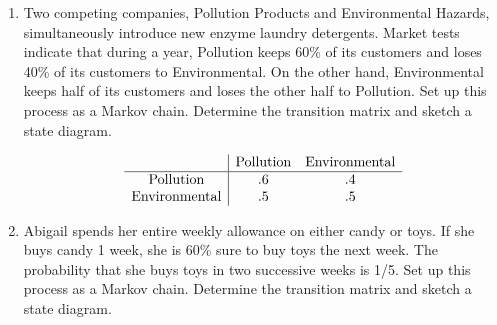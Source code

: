 \documentclass{hw}
\begin{document}
\begin{enumerate}
\item Two competing companies, Pollution Products and Environmental Hazards, simultaneously introduce
new enzyme laundry detergents. Market tests indicate that during a year, Pollution keeps 60\% of
its customers and loses 40\% of its customers to Environmental. On the other hand, Environmental
keeps half of its customers and loses the other half to Pollution. Set up this process as a Markov
chain. Determine the transition matrix and sketch a state diagram.

\begin{minipage}{0.5\textwidth}
\[
\begin{array}{c | c c}
& \text{Pollution} & \text{Environmental}\\
\hline
\text{Pollution} & .6 & .4\\
\text{Environmental} & .5 & .5
\end{array}
\]
\end{minipage}
\begin{minipage}{0.5\textwidth}
\begin{center}
\end{center}
\end{minipage}

\item Abigail spends her entire weekly allowance on either candy or toys. If she buys candy 1 week,
she is 60\% sure to buy toys the next week. The probability that she buys toys in two successive
weeks is 1/5. Set up this process as a Markov chain. Determine the transition matrix and sketch a
state diagram.


\end{enumerate}
\end{document}
